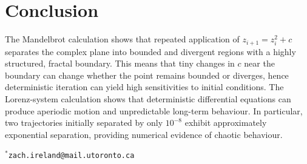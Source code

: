 \documentclass[aps,twocolumn,longbibliography,nofootinbib]{revtex4-2}
\makeatletter
\newcommand{\contactblock}{%
  \onecolumngrid
    \vspace{1em}
    \begingroup\footnotesize\raggedright
      $^{\ast}$\texttt{zach.ireland@mail.utoronto.ca}
    \endgroup
    \vspace{1em}
  \twocolumngrid
}
\makeatother
\begin{document}
\section{Conclusion}
The Mandelbrot calculation shows that repeated application of $z_{i+1}=z_i^2+c$ separates the complex plane into bounded and divergent regions with a highly structured, fractal boundary. This means that tiny changes in $c$ near the boundary can change whether the point remains bounded or diverges, hence deterministic iteration can yield high sensitivities to initial conditions. The Lorenz-system calculation shows that deterministic differential equations can produce aperiodic motion and unpredictable long-term behaviour. In particular, two trajectories initially separated by only $10^{-8}$ exhibit approximately exponential separation, providing numerical evidence of chaotic behaviour.

\newpage
\newpage
\contactblock
\clearpage

\end{document}
